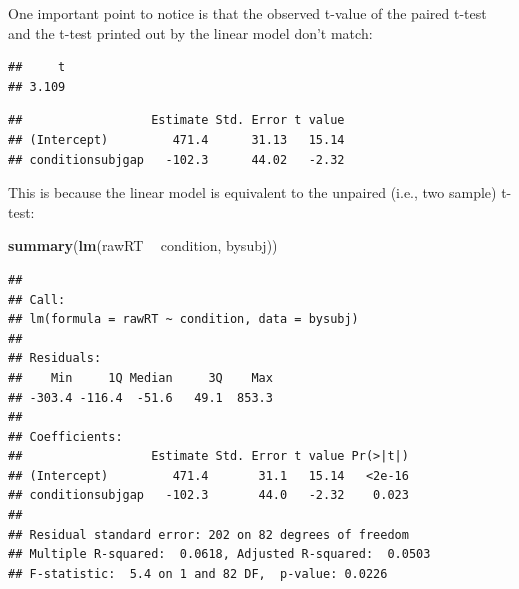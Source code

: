 \documentclass[12pt,]{krantz}
\newenvironment{Shaded}{\begin{snugshade}}{\end{snugshade}}
\newcommand{\DataTypeTok}[1]{\textcolor[rgb]{0.13,0.29,0.53}{#1}}
\newcommand{\DecValTok}[1]{\textcolor[rgb]{0.00,0.00,0.81}{#1}}
\newcommand{\KeywordTok}[1]{\textcolor[rgb]{0.13,0.29,0.53}{\textbf{#1}}}
\newcommand{\NormalTok}[1]{#1}
\newcommand{\OperatorTok}[1]{\textcolor[rgb]{0.81,0.36,0.00}{\textbf{#1}}}
\newcommand{\OtherTok}[1]{\textcolor[rgb]{0.56,0.35,0.01}{#1}}
\newcommand{\StringTok}[1]{\textcolor[rgb]{0.31,0.60,0.02}{#1}}
\begin{document}
One important point to notice is that the observed t-value of the paired t-test and the t-test printed out by the linear model don't match:

\begin{Shaded}
\end{Shaded}

\begin{verbatim}
##     t 
## 3.109
\end{verbatim}

\begin{Shaded}
\end{Shaded}

\begin{verbatim}
##                  Estimate Std. Error t value
## (Intercept)         471.4      31.13   15.14
## conditionsubjgap   -102.3      44.02   -2.32
\end{verbatim}

This is because the linear model is equivalent to the unpaired (i.e., two sample) t-test:

\begin{Shaded}
\begin{Highlighting}[]
\KeywordTok{summary}\NormalTok{(}\KeywordTok{lm}\NormalTok{(rawRT }\OperatorTok{~}\StringTok{ }\NormalTok{condition, bysubj))}
\end{Highlighting}
\end{Shaded}

\begin{verbatim}
## 
## Call:
## lm(formula = rawRT ~ condition, data = bysubj)
## 
## Residuals:
##    Min     1Q Median     3Q    Max 
## -303.4 -116.4  -51.6   49.1  853.3 
## 
## Coefficients:
##                  Estimate Std. Error t value Pr(>|t|)
## (Intercept)         471.4       31.1   15.14   <2e-16
## conditionsubjgap   -102.3       44.0   -2.32    0.023
## 
## Residual standard error: 202 on 82 degrees of freedom
## Multiple R-squared:  0.0618,	Adjusted R-squared:  0.0503 
## F-statistic:  5.4 on 1 and 82 DF,  p-value: 0.0226
\end{verbatim}
\end{document}
